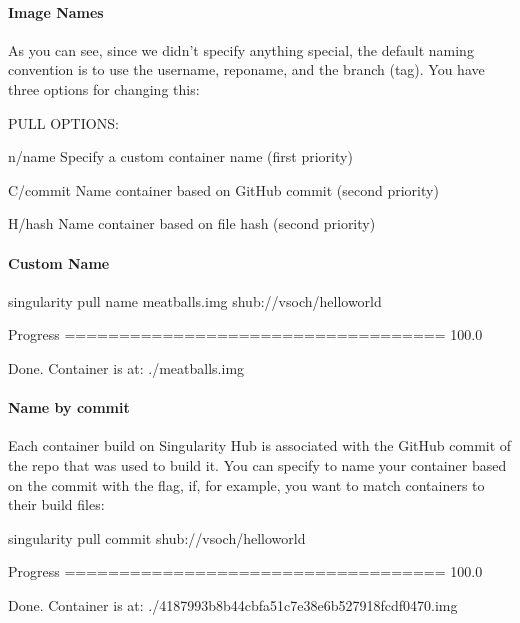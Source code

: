 \documentclass[letterpaper,10pt,english]{sphinxmanual}
\begin{document}
\paragraph{Image Names}
\label{\detokenize{appendix:image-names}}
As you can see, since we didn’t specify anything special, the default
naming convention is to use the username, reponame, and the branch
(tag). You have three options for changing this:

%
\begin{sphinxVerbatim}[commandchars=\\\{\}]
PULL OPTIONS:

    \PYGZhy{}n/\PYGZhy{}\PYGZhy{}name   Specify a custom container name (first priority)

    \PYGZhy{}C/\PYGZhy{}\PYGZhy{}commit Name container based on GitHub commit (second priority)

    \PYGZhy{}H/\PYGZhy{}\PYGZhy{}hash   Name container based on file hash (second priority)
\end{sphinxVerbatim}


\paragraph{Custom Name}
\label{\detokenize{appendix:custom-name}}
%
\begin{sphinxVerbatim}[commandchars=\\\{\}]
singularity pull \PYGZhy{}\PYGZhy{}name meatballs.img shub://vsoch/hello\PYGZhy{}world

Progress \textbar{}===================================\textbar{} 100.0\PYGZpc{}

Done. Container is at: ./meatballs.img
\end{sphinxVerbatim}


\paragraph{Name by commit}
\label{\detokenize{appendix:name-by-commit}}
Each container build on Singularity Hub is associated with the GitHub
commit of the repo that was used to build it. You can specify to name
your container based on the commit with the  flag, if, for example, you
want to match containers to their build files:

%
\begin{sphinxVerbatim}[commandchars=\\\{\}]
singularity pull \PYGZhy{}\PYGZhy{}commit shub://vsoch/hello\PYGZhy{}world

Progress \textbar{}===================================\textbar{} 100.0\PYGZpc{}

Done. Container is at: ./4187993b8b44cbfa51c7e38e6b527918fcdf0470.img
\end{sphinxVerbatim}
\end{document}
